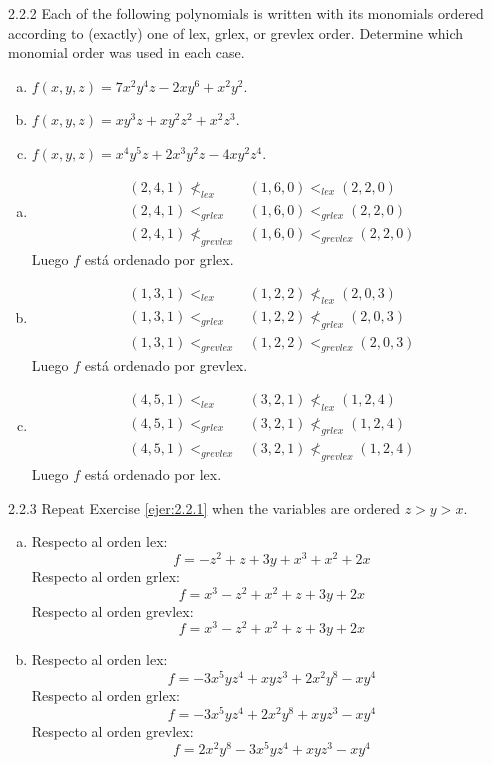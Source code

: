 \documentclass[twoside]{article}
\newcommand{\lex}{<_{lex}}
\newcommand{\grlex}{<_{grlex}}
\newcommand{\grevlex}{<_{grevlex}}
\begin{document}
\begin{ejercicio}{2.2.2}
Each of the following polynomials is written with its monomials ordered according to (exactly) one of lex, grlex, or grevlex order. Determine which monomial order was used in each case.
\begin{enumerate}[a.]
\item $f(x,y,z) = 7x^2y^4z - 2xy^6 + x^2y^2$.
\item $f(x,y,z) = xy^3z + xy^2z^2 + x^2z^3$.
\item $f(x,y,z) = x^4y^5z + 2x^3y^2z - 4xy^2z^4$.
\end{enumerate}
\end{ejercicio}
\begin{solucion}\mbox{}
\begin{enumerate}[a.]
\item
\begin{align*}
(2,4,1) \not\lex & (1,6,0) \lex (2,2,0)\\
(2,4,1) \grlex & (1,6,0) \grlex (2,2,0)\\
(2,4,1) \not\grevlex & (1,6,0) \grevlex (2,2,0)
\end{align*}
Luego $f$ está ordenado por grlex.
\item
\begin{align*}
(1,3,1) \lex & (1,2,2) \not\lex (2,0,3)\\
(1,3,1) \grlex & (1,2,2) \not\grlex (2,0,3)\\
(1,3,1) \grevlex & (1,2,2) \grevlex (2,0,3)
\end{align*}
Luego $f$ está ordenado por grevlex.
\item
\begin{align*}
(4,5,1) \lex & (3,2,1) \not\lex (1,2,4)\\
(4,5,1) \grlex & (3,2,1) \not\grlex (1,2,4)\\
(4,5,1) \grevlex & (3,2,1) \not\grevlex (1,2,4)
\end{align*}
Luego $f$ está ordenado por lex.
\end{enumerate}
\end{solucion}

\newpage

\begin{ejercicio}{2.2.3}
Repeat Exercise \ref{ejer:2.2.1} when the variables are ordered $z > y > x$.
\end{ejercicio}
\begin{solucion}\mbox{}
\begin{enumerate}[a.]
\item Respecto al orden lex:
 \[ f = -z^2 + z + 3y + x^3 + x^2 + 2x \]
 Respecto al orden grlex:
 \[ f = x^3 - z^2 + x^2  + z + 3y + 2x \]
 Respecto al orden grevlex:
 \[ f = x^3 - z^2 + x^2  + z + 3y + 2x \]
\item Respecto al orden lex:
 \[ f = -3x^5yz^4 + xyz^3 + 2x^2y^8 - xy^4 \]
 Respecto al orden grlex:
 \[ f = -3x^5yz^4 + 2x^2y^8 + xyz^3 - xy^4 \]
 Respecto al orden grevlex:
 \[ f = 2x^2y^8 - 3x^5yz^4 + xyz^3 - xy^4 \]
\end{enumerate}
\end{solucion}
\end{document}
